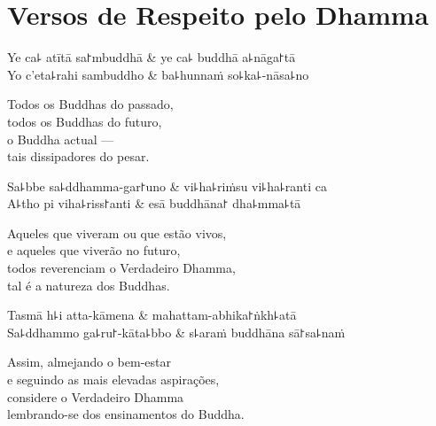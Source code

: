 \chapter{Versos de Respeito pelo Dhamma}


\begin{leader}
\end{leader}

\begin{twochants}
  Ye ca꜕ atītā sa꜓mbuddhā & ye ca꜕ buddhā a꜕nāga꜓tā \\
  Yo c'eta꜕rahi sambuddho & ba꜕hunnaṁ so꜕ka꜕-nāsa꜕no \\
\end{twochants}

\begin{english}
  Todos os Buddhas do passado,\\
  todos os Buddhas do futuro,\\
  o Buddha actual ---\\
  tais dissipadores do pesar.
\end{english}

\begin{twochants}
  Sa꜕bbe sa꜕ddhamma-gar꜓uno & vi꜕ha꜕riṁsu vi꜕ha꜕ranti ca \\
  A꜕tho pi viha꜕riss꜓anti & esā buddhāna꜓ dha꜕mma꜕tā \\
\end{twochants}

\begin{english}
  Aqueles que viveram ou que estão vivos,\\
  e aqueles que viverão no futuro,\\
  todos reverenciam o Verdadeiro Dhamma,\\
  tal é a natureza dos Buddhas.
\end{english}

\begin{twochants}
  Tasmā h꜕i atta-kāmena & mahattam-abhika꜓ṅkh꜕atā \\
  Sa꜕ddhammo ga꜕ru꜓-kāta꜕bbo & s꜕araṁ buddhāna sā꜓sa꜕naṁ \\
\end{twochants}

\begin{english}
  Assim, almejando o bem-estar\\
  e seguindo as mais elevadas aspirações,\\
  considere o Verdadeiro Dhamma\\
  lembrando-se dos ensinamentos do Buddha.
\end{english}

